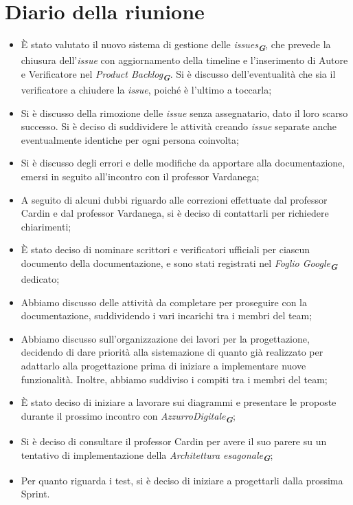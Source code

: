 
\section{Diario della riunione}

\begin{itemize}
    \item È stato valutato il nuovo sistema di gestione delle \emph{issues}\textsubscript{\textit{\textbf{G}}}, che prevede la
    chiusura dell'\emph{issue} con aggiornamento della timeline e l'inserimento di Autore e Verificatore nel
    \emph{Product Backlog}\textsubscript{\textit{\textbf{G}}}. Si è discusso dell'eventualità che sia il verificatore a chiudere
    la \emph{issue}, poiché è l'ultimo a toccarla;
    \item Si è discusso della rimozione delle \emph{issue} senza assegnatario, dato il loro scarso successo. Si è deciso di
    suddividere le attività creando \emph{issue} separate anche eventualmente identiche per ogni persona coinvolta;
    \item Si è discusso degli errori e delle modifiche da apportare alla documentazione, emersi in seguito all'incontro con il
    professor Vardanega;
    \item A seguito di alcuni dubbi riguardo alle correzioni effettuate dal professor Cardin e dal professor Vardanega, si è deciso
    di contattarli per richiedere chiarimenti;
    \item È stato deciso di nominare scrittori e verificatori ufficiali per ciascun documento della documentazione, e sono stati
    registrati nel \emph{Foglio Google}\textsubscript{\textit{\textbf{G}}} dedicato;
    \item Abbiamo discusso delle attività da completare per proseguire con la documentazione, suddividendo i vari incarichi tra i
    membri del team;
    \item Abbiamo discusso sull'organizzazione dei lavori per la progettazione, decidendo di dare priorità alla sistemazione di
    quanto già realizzato per adattarlo alla progettazione prima di iniziare a implementare nuove funzionalità. Inoltre, abbiamo
    suddiviso i compiti tra i membri del team;
    \item È stato deciso di iniziare a lavorare sui diagrammi e presentare le proposte durante il prossimo incontro con 
    \emph{AzzurroDigitale}\textsubscript{\textit{\textbf{G}}}; 
    \item Si è deciso di consultare il professor Cardin per avere il suo parere su un tentativo di implementazione della
    \emph{Architettura esagonale}\textsubscript{\textit{\textbf{G}}};
    \item Per quanto riguarda i test, si è deciso di iniziare a progettarli dalla prossima Sprint.
 \end{itemize}

